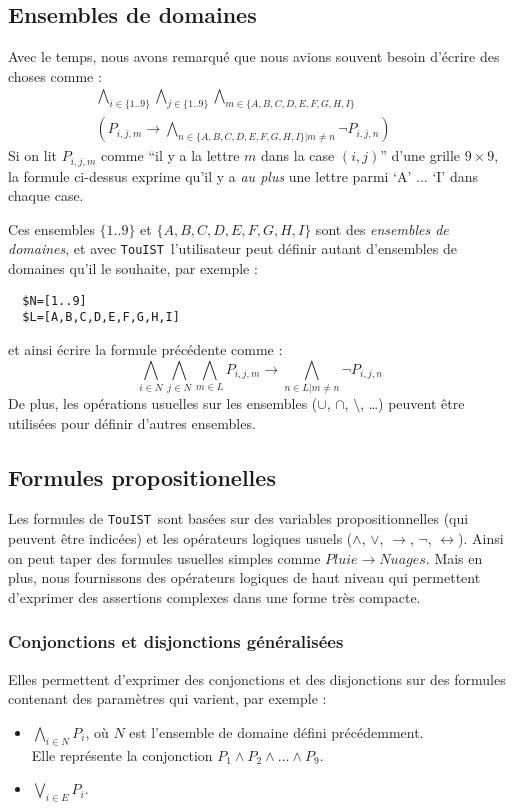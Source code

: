 \documentclass{iaf}
\newcommand{\IMPL}[0]{\longrightarrow}
\newcommand{\AND}[0]{\wedge}
\newcommand{\OR}[0]{\vee}
\newcommand{\NOT}[0]{\neg}
\newcommand{\IFF}[0]{\leftrightarrow}
\newcommand{\nameTool}{{\sc \texttt {TouIST}}}
\begin{document}
\subsection{Ensembles de domaines}
Avec le temps, nous avons remarqu\'e que nous avions souvent besoin d'\'ecrire des choses comme :
$$\begin{aligned}\bigwedge_{i \in \{1..9\}} \bigwedge_{j \in \{1..9\}}\bigwedge_{ m\in \{A,B,C,D,E,F,G,H,I\}} \hspace{2cm}\\ \left( P_{i,j,m}\IMPL \bigwedge_{n \in \{A,B,C,D,E,F,G,H,I\}|m\neq n}\NOT P_{i,j,n}\right)\end{aligned}$$
Si on lit $P_{i,j,m}$ comme  ``il y a la lettre $m$ dans la case $(i,j)$'' d'une grille $9\times 9$, la formule ci-dessus exprime qu'il y a \emph{au plus} une lettre parmi `A' ... `I' dans chaque case. 

Ces ensembles $\{1..9\}$ et $\{A,B,C,D,E,F,G,H,I\}$ sont des \emph{ensembles de domaines}, et avec \nameTool\ l'utilisateur peut d\'efinir autant d'ensembles de domaines qu'il le souhaite, par exemple :

\begin{verbatim}
  $N=[1..9]
  $L=[A,B,C,D,E,F,G,H,I]
\end{verbatim}

et ainsi \'ecrire la formule pr\'ec\'edente comme :
$$\bigwedge_{i \in N} \bigwedge_{j \in N}\bigwedge_{ m\in L}P_{i,j,m}\IMPL \bigwedge_{n \in L|m\neq n}\NOT P_{i,j,n}$$
De plus, les op\'erations usuelles sur les ensembles ($\cup$, $\cap$, $\setminus$, \ldots) peuvent \^etre utilis\'ees pour d\'efinir d'autres ensembles.


\subsection{Formules propositionelles}

Les formules de \nameTool\ sont bas\'ees sur des variables propositionnelles (qui peuvent \^etre indic\'ees) et les op\'erateurs logiques usuels ($\AND$, $\OR$, $\IMPL$, $\NOT$, $\IFF$). Ainsi on peut taper des formules usuelles simples comme $Pluie \IMPL Nuages$. Mais en plus, nous fournissons des op\'erateurs logiques de haut niveau qui permettent d'exprimer des assertions complexes dans une forme tr\`es compacte.

\subsubsection*{Conjonctions et disjonctions g\'en\'eralis\'ees}
Elles permettent d'exprimer des conjonctions et des disjonctions sur des formules contenant des param\`etres qui varient, par exemple :
\begin{itemize}
\item $ \bigwedge_{i \in N} P_i$, o\`u $N$ est l'ensemble de domaine d\'efini pr\'ec\'edemment.\\
  Elle repr\'esente la conjonction
  $P_1 \AND P_2 \AND \ldots \AND P_9$. 
\item $\bigvee_{i \in E} P_i$.
\end{itemize}
\end{document}
